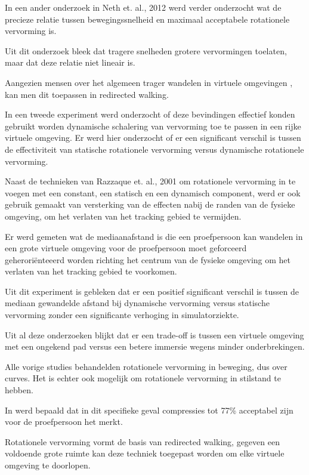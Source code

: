 \documentclass[a4paper,12pt]{article}
\begin{document}
In een ander onderzoek in Neth et. al., 2012 \cite{neth12} werd verder 
onderzocht wat de precieze relatie tussen bewegingssnelheid en maximaal 
acceptabele rotationele vervorming is.

Uit dit onderzoek bleek dat tragere snelheden grotere vervormingen toelaten, maar
dat deze relatie niet lineair is.

Aangezien mensen over het algemeen trager wandelen in virtuele omgevingen
\cite{mohler07}, kan men dit toepassen in redirected walking.

In een tweede experiment \cite{neth12} werd onderzocht of deze bevindingen
effectief konden gebruikt worden dynamische schalering van vervorming toe te
passen in een rijke virtuele omgeving. Er werd hier onderzocht of er een
significant verschil is tussen de effectiviteit van statische rotationele
vervorming versus dynamische rotationele vervorming.

Naast de technieken van Razzaque et. al., 2001 \cite{kohn01} om rotationele
vervorming in te voegen met een constant, een statisch en een dynamisch 
component, werd er ook gebruik gemaakt van versterking van de effecten nabij de 
randen van de fysieke omgeving, om het verlaten van het tracking gebied te 
vermijden.

Er werd gemeten wat de mediaanafstand is die een proefpersoon kan wandelen in 
een grote virtuele omgeving voor de proefpersoon moet geforceerd 
geherori\"enteeerd worden richting het centrum van de fysieke omgeving om het 
verlaten van het tracking gebied te voorkomen.

Uit dit experiment is gebleken dat er een positief significant verschil is tussen
de mediaan gewandelde afstand bij dynamische vervorming versus statische
vervorming zonder een significante verhoging in simulatorziekte.

Uit al deze onderzoeken blijkt dat er een trade-off is tussen een virtuele 
omgeving met een ongekend pad\cite{neth12} versus een betere immersie wegens 
minder onderbrekingen\cite{engel08,kohn01}. 

Alle vorige studies behandelden rotationele vervorming in beweging, dus over 
curves. Het is echter ook mogelijk om rotationele vervorming in stilstand te
hebben.

In \cite{steinicke09} werd bepaald dat in dit specifieke geval compressies tot
77\% acceptabel zijn voor de proefpersoon het merkt.

Rotationele vervorming vormt de basis van redirected walking, gegeven een
voldoende grote ruimte kan deze techniek toegepast worden om elke virtuele
omgeving te doorlopen.
\end{document}
